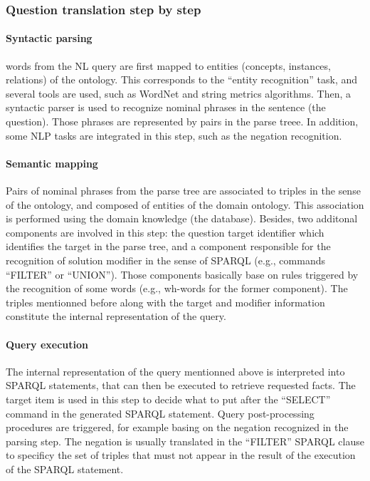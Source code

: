 \documentclass[10pt,journal,letterpaper,compsoc]{IEEEtran}
\begin{document}
\subsubsection{Question translation step by step}
\paragraph{Syntactic parsing}
words from the NL query are first mapped to
entities (concepts, instances, relations) of the ontology. This corresponds
to the ``entity recognition'' task, and several tools are used, such as
WordNet and string metrics algorithms.
Then, a syntactic parser is used to recognize nominal phrases in the
sentence (the question). Those phrases are represented by pairs in the
parse treee.
In addition, some NLP tasks are integrated in this step, such as the
negation recognition.

\paragraph{Semantic mapping}
Pairs of nominal phrases from the parse tree
are associated to triples in the sense of the ontology, and composed of
entities of the domain ontology.
This association is performed using the domain knowledge (the database).
Besides, two additonal components are involved in this step: the question
target identifier which identifies the target in the parse tree, and a
component responsible for the recognition of solution modifier in the sense
of SPARQL (e.g., commands ``FILTER'' or ``UNION''). Those components
basically base on rules triggered by the recognition of some words (e.g.,
wh-words for the former component).
The triples mentionned before along with the target and
modifier information constitute the internal representation of the query.

\paragraph{Query execution}
The internal representation of the query
mentionned above is interpreted into SPARQL statements, that can then be
executed to retrieve requested facts.
The target item is used in this step to decide what to
put after the ``SELECT'' command in the generated SPARQL statement.
Query post-processing procedures are triggered, for example basing on the
negation recognized in the parsing step. The negation is usually translated
in the ``FILTER'' SPARQL clause to specificy the set of triples that must
not appear in the result of the execution of the SPARQL statement.
\end{document}
